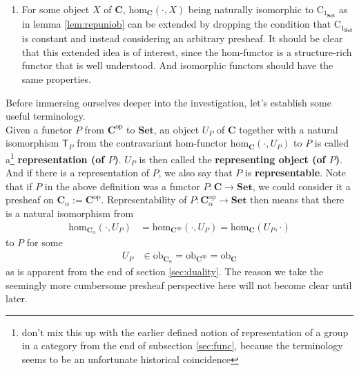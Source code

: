\begin{enumerate}
\begin{align*}
  \\
  \mathsf{T}
  &\mapsto
  (\mathsf{T}(X))(\mathrm{id}_{X})
\end{align*}
is a bijection for all presheaves $P$ and objects $X$.
\item[(c)]
For some object $X$ of $\mathbf{C}$, $\mathrm{hom}_{\mathbf{C}}(\cdot,X)$ being naturally isomorphic to $\mathrm{C}_{1_{\mathbf{Set}}}$ as in lemma \ref{lem:repuniob} can be extended by dropping the condition that $\mathrm{C}_{1_{\mathbf{Set}}}$ is constant and instead considering an arbitrary presheaf.
It should be clear that this extended idea is of interest, since the hom-functor is a structure-rich functor that is well understood.
And isomorphic functors should have the same properties.
\end{enumerate}
Before immersing ourselves deeper into the investigation, let's establish some useful terminology.
\\
Given a functor $P$ from $\mathbf{C}^{\mathrm{op}}$ to $\mathbf{Set}$, an object $U_{P}$ of $\mathbf{C}$ together with a natural isomorphism $\mathsf{T}_{P}$ from the contravariant hom-functor $\mathrm{hom}_{\mathbf{C}}(\cdot,U_{P})$ to $P$ is called a\footnote{don't mix this up with the earlier defined notion of representation of a group in a category from the end of subsection \ref{sec:func}, because the terminology seems to be an unfortunate historical coincidence} \textbf{representation (of $P$)}.
$U_{P}$ is then called the \textbf{representing object (of $P$)}.
And if there is a representation of $P$, we also say that $P$ is \textbf{representable}.
Note that if $P$ in the above definition was a functor $P \colon \mathbf{C} \rightarrow \mathbf{Set}$, we could consider it a presheaf on $\mathbf{C}_{\alpha} := \mathbf{C}^{\mathrm{op}}$.
Representability of $P \colon \mathbf{C}_{\alpha}^{\mathrm{op}} \rightarrow \mathbf{Set}$ then means that there is a natural isomorphism from
\begin{align*}
  \mathrm{hom}_{\mathbf{C}_{\alpha}}(\cdot,U_{P})
  &=
  \mathrm{hom}_{\mathbf{C}^{\mathrm{op}}}(\cdot,U_{P})
  =
  \mathrm{hom}_{\mathbf{C}}(U_{P},\cdot)
\end{align*}
to $P$ for some
\begin{align*}
  U_{P}
  &\in
  \mathrm{ob}_{\mathbf{C}_{\alpha}}
  =
  \mathrm{ob}_{\mathbf{C}^{\mathrm{op}}}
  =
  \mathrm{ob}_{\mathbf{C}}
\end{align*}
as is apparent from the end of section \ref{sec:duality}.
The reason we take the seemingly more cumbersome presheaf perspective here will not become clear until later.
